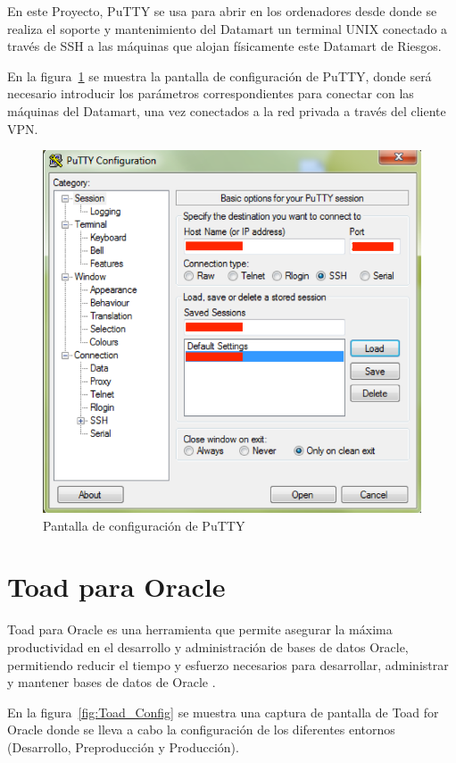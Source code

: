 \documentclass[a4paper, 12pt]{book}
\begin{document}
En este Proyecto, PuTTY se usa para abrir en los ordenadores desde donde se realiza el soporte y mantenimiento del Datamart un terminal UNIX conectado a través de SSH a las máquinas que alojan físicamente este Datamart de Riesgos.

En la figura~\ref{fig:PuTTY_Config} se muestra la pantalla de configuración de PuTTY, donde será necesario introducir los parámetros correspondientes para conectar con las máquinas del Datamart, una vez conectados a la red privada a través del cliente VPN.

\begin{figure}
   \centering
   \includegraphics[width=12cm, keepaspectratio]{img/puttyconfig}
   \caption{Pantalla de configuración de PuTTY}
   \label{fig:PuTTY_Config}
\end{figure}

\section{Toad para Oracle}
\label{sec:Toad para Oracle}
Toad para Oracle es una herramienta que permite asegurar la máxima productividad en el desarrollo y administración de bases de datos Oracle, permitiendo reducir el tiempo y esfuerzo necesarios para desarrollar, administrar y mantener bases de datos de Oracle \cite{toad1}.

En la figura~\ref{fig:Toad_Config} se muestra una captura de pantalla de Toad for Oracle donde se lleva a cabo la configuración de los diferentes entornos (Desarrollo, Preproducción y Producción).
\end{document}
